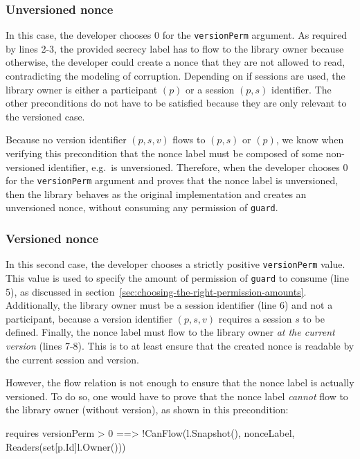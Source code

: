 \subsubsection{Unversioned nonce}
\label{sec:unversioned-nonce}

In this case, the developer chooses $0$ for the \texttt{versionPerm} argument.
As required by lines 2-3, the provided secrecy label has to flow to the library owner because otherwise, the developer could create a nonce that they are not allowed to read, contradicting the modeling of corruption.
Depending on if sessions are used, the library owner is either a participant $(p)$ or a session $(p,s)$ identifier.
The other preconditions do not have to be satisfied because they are only relevant to the versioned case.

Because no version identifier $(p,s,v)$ flows to $(p,s)$ or $(p)$, we know when verifying this precondition that the nonce label must be composed of some non-versioned identifier, e.g.\  is unversioned.
Therefore, when the developer chooses $0$ for the \texttt{versionPerm} argument and proves that the nonce label is unversioned, then the library behaves as the original implementation and creates an unversioned nonce, without consuming any permission of \texttt{guard}.

\subsubsection{Versioned nonce}
\label{sec:versioned-nonce}

In this second case, the developer chooses a strictly positive \texttt{versionPerm} value.
This value is used to specify the amount of permission of \texttt{guard} to consume (line 5), as discussed in section~\ref{sec:choosing-the-right-permission-amounts}.
Additionally, the library owner must be a session identifier (line 6) and not a participant, because a version identifier $(p,s,v)$ requires a session $s$ to be defined.
Finally, the nonce label must flow to the library owner \emph{at the current version} (lines 7-8).
This is to at least ensure that the created nonce is readable by the current session and version.

However, the flow relation is not enough to ensure that the nonce label is actually versioned. To do so, one would have to prove that the nonce label \emph{cannot} flow to the library owner (without version), as shown in this precondition:

\begin{gobra}
requires versionPerm > 0 ==>
    !CanFlow(l.Snapshot(), nonceLabel, Readers(set[p.Id]{l.Owner()}))
\end{gobra}

